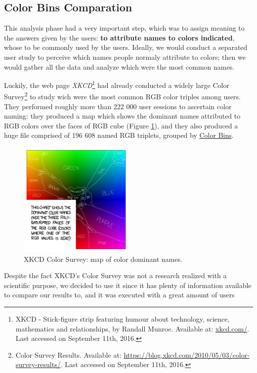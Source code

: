 \subsection{Color Bins Comparation}
\label{subsec:results_preparation}
%
This analysis phase had a very important step, which was to assign meaning to the answers given by the users: \textbf{to attribute names to colors indicated}, whose to be commonly used by the users.
Ideally, we would conduct a separated user study to perceive which names people normaly attribute to colors; then we would gather all the data and analyze which were the most common names. \par
%
Luckily, the web page \emph{XKCD}\footnote{XKCD - Stick-figure strip featuring humour about technology, science, mathematics and relationships, by Randall Munroe.
Available at: \url{xkcd.com/}. Last accessed on September 11th, 2016.} had already conducted a widely large Color Survey\footnote{Color Survey Results. Available at:
\url{https://blog.xkcd.com/2010/05/03/color-survey-results/}. Last accessed on September 11th, 2016.} to study wich were the most common RGB color triples among users. They performed roughly more
than 222 000 user sessions to ascertain color naming: they produced a map which shows the dominant names attributed to \gls{RGB} colors over the faces of \gls{RGB} cube (Figure \ref{fig:colornames_xkcd}),
and they also produced a huge file comprised of 196 608 named \gls{RGB} triplets, grouped by \ul{Color Bins}.
%
\begin{figure}[htbp]
	\centering
  \includegraphics[width=0.5\textwidth]{images/results/satfaces_map.png}
  \caption[XKCD Color Survey: Color Dominant Names]{XKCD Color Survey: map of color dominant names.\protect\footnotemark{}}
  \label{fig:colornames_xkcd}
\end{figure} \par
%
Despite the fact XKCD's Color Survey was not a research realized with a scientific purpose, we decided to use it since it has plenty of information available to compare our results to, and it was executed with a great amount of users
